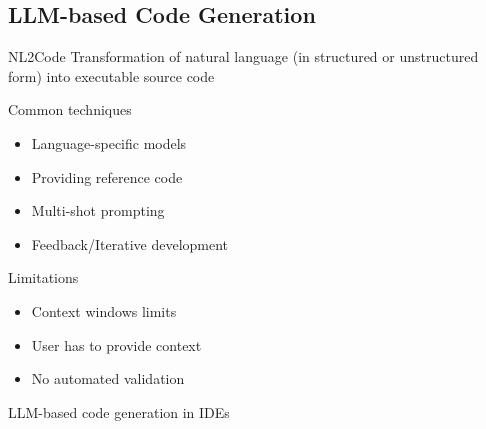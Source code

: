%		
%		

\subsection{LLM-based Code Generation}
\begin{frame}{\insertsubsection{}  }
	\begin{fancycolumns}[animation=none]
		\begin{definition}{NL2Code}
			Transformation of natural language (in structured or unstructured form) into executable source code
		\end{definition} \pause
		\begin{note}{Common techniques}
			\begin{itemize}
				\item Language-specific models
				\item Providing reference code
				\item Multi-shot prompting
				\item Feedback/Iterative development
			\end{itemize}
		\end{note} \pause
		\begin{note}{Limitations}
			\begin{itemize}
				\item Context windows limits
				\item User has to provide context
				\item No automated validation
			\end{itemize}
		\end{note} \pause
		\nextcolumn
		\begin{example}{LLM-based code generation in IDEs}
			\centering{}
		\end{example}
	\end{fancycolumns}
\end{frame}

